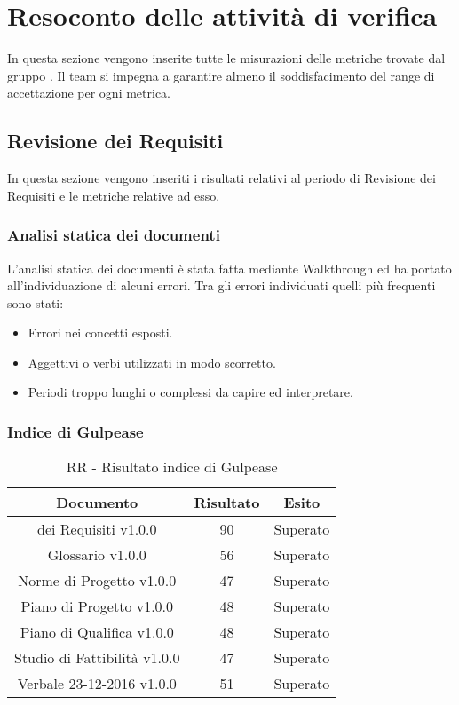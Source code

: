 \section{Resoconto delle attività di verifica}

In questa sezione vengono inserite tutte le misurazioni delle metriche trovate dal gruppo \gruppo.
Il team si impegna a garantire almeno il soddisfacimento del range di accettazione per ogni metrica.


\subsection{Revisione dei Requisiti}
In questa sezione vengono inseriti i risultati relativi al periodo di Revisione dei Requisiti e le metriche relative ad esso.

\subsubsection{Analisi statica dei documenti}
L'analisi statica dei documenti è stata fatta mediante Walkthrough ed ha portato all'individuazione di alcuni errori. Tra gli errori individuati quelli più frequenti sono stati:
		\begin{itemize}
			\item Errori nei concetti esposti.
			\item Aggettivi o verbi utilizzati in modo scorretto.
			\item Periodi troppo lunghi o complessi da capire ed interpretare.
		\end{itemize}
		
\subsubsection{Indice di Gulpease}

\begin{table}[h]
	\begin{center}
		\begin{tabular}{|c|c|c|}
			\hline
			\textbf{Documento}	& \textbf{Risultato} & \textbf{Esito} \\
			\hline
		 \termine{Analisi} dei Requisiti v1.0.0 & 90 & Superato	\\
			\hline
			Glossario v1.0.0 & 56 & Superato	\\
			\hline
			Norme di Progetto v1.0.0 & 47 & Superato \\
			\hline
			Piano di Progetto v1.0.0 & 48 & Superato\\
			\hline
			Piano di Qualifica v1.0.0	& 48 & Superato\\
			\hline
			Studio di Fattibilità v1.0.0	& 47 & Superato\\
			\hline
			Verbale 23-12-2016 v1.0.0	& 51 & Superato	\\
			\hline
		\end{tabular}
	\end{center}
	\caption{RR - Risultato indice di Gulpease}
\end{table}





